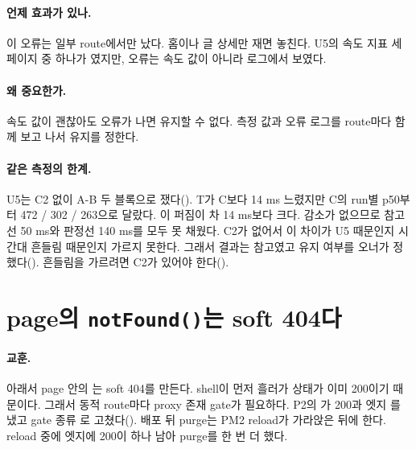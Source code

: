 \paragraph{언제 효과가 있나.}
이 오류는 일부 route에서만 났다. 홈이나 글 상세만 재면 놓친다. U5의 속도 지표 세 페이지 중 하나가 였지만, 오류는 속도 값이 아니라 로그에서 보였다.

\paragraph{왜 중요한가.}
속도 값이 괜찮아도 오류가 나면 유지할 수 없다. 측정 값과 오류 로그를 route마다 함께 보고 나서 유지를 정한다.

\paragraph{같은 측정의 한계.}
U5는 C2 없이 A-B 두 블록으로 쟀다(). T가 C보다 14 ms 느렸지만 C의 run별 p50부터 472 / 302 / 263으로 달랐다. 이 퍼짐이 차 14 ms보다 크다.
감소가 없으므로 참고선 50 ms와  판정선 140 ms를 모두 못 채웠다.
C2가 없어서 이 차이가 U5 때문인지 시간대 흔들림 때문인지 가르지 못한다.
그래서 결과는 참고였고 유지 여부를 오너가 정했다(). 흔들림을 가르려면 C2가 있어야 한다().

\section{page의 \texttt{notFound()}는 soft 404다}\label{sec:le-softnf}

\paragraph{교훈.}
 아래서 page 안의 는 soft 404를 만든다. shell이 먼저 흘러가 상태가 이미 200이기 때문이다.
그래서 동적 route마다 proxy 존재 gate가 필요하다. P2의 가 200과 엣지 를 냈고 gate 종류 로 고쳤다().
배포 뒤 purge는 PM2 reload가 가라앉은 뒤에 한다. reload 중에 엣지에 200이 하나 남아 purge를 한 번 더 했다.
